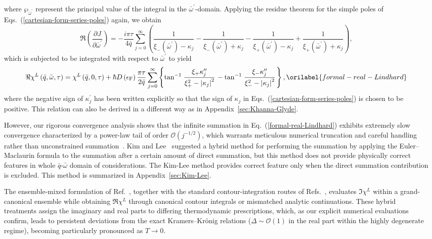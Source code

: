 \documentclass[aps,showkeys,noshowpacs,superscriptaddress,pre,preprint]{revtex4-2}
\let\label\orilabel
\begin{document}
where $\wp_{\bar{\omega}^\prime}$ represent the principal value of the integral in the $\bar{\omega}^\prime$-domain.
Applying the residue theorem for the simple poles of Eqs.~(\ref{cartesian-form-series-poles}) again,
we obtain
\begin{equation*}
\Re \left( \frac{\partial J}{\partial \bar{\omega}^\prime} \right) =
- \frac{ i \pi \tau}{4 \bar{q}} \sum_{j = 0}^{\infty} 
\left(
\frac{1}{\xi_{-} \left( {\bar{\omega}^\prime} \right) - \kappa_j } - \frac{1}{\xi_{-} \left( {\bar{\omega}^\prime} \right) + \kappa_j }
- \frac{1}{\xi_{+} \left( {\bar{\omega}^\prime} \right) - \kappa_j } + \frac{1}{\xi_{+} \left( {\bar{\omega}^\prime} \right) + \kappa_j }
\right)  ,
\end{equation*}
which is subjected to be integrated with respect to $\bar{\omega}^\prime$ to yield
\begin{equation}
\Re \chi^L \left( \bar{q} , \bar{\omega}, \tau \right) =
\chi^L \left( \bar{q} , 0, \tau \right)
+ \hbar D\left( \epsilon_\mathrm{F} \right) \frac{ \pi \tau}{ 2 \bar{q}} \sum_{j = 0}^{\infty}
\left\{
\tan^{-1}\left. \frac{\xi_+ \kappa_j^{\prime\prime}}{\xi_+^2 - \left\vert \kappa_j \right\vert^2} \right.
- \tan^{-1}\left. \frac{\xi_- \kappa_j^{\prime\prime}}{\xi_-^2 - \left\vert \kappa_j \right\vert^2} \right.
\right\} ,
\label{formal-real-Lindhard}
\end{equation}
where the negative sign of $\kappa_j^\prime$ has been written explicitly
so that the sign of $\kappa_j$ in Eqs.~(\ref{cartesian-form-series-poles}) is chosen to be positive.
This relation can also be derived in a different way as in Appendix~\ref{sec:Khanna-Glyde}.

However, our rigorous convergence analysis shows that the infinite summation in Eq.~(\ref{formal-real-Lindhard}) exhibits extremely slow convergence characterized by a power-law tail of order $\mathcal{O}(j^{-1/2})$, which warrants meticulous numerical truncation and careful handling rather than unconstrained summation~\cite{Khanna-Glyde1976,Gouedard-Deutsch1978}.
Kim and Lee~\cite{Kim-Lee1998} suggested a hybrid method for performing the summation 
by applying the Euler--Maclaurin formula to the summation after a certain amount of direct summation,
but this method does not provide physically correct features in whole $\bar{q}$-$\bar{\omega}$ domain of considerations.
The Kim-Lee method provides correct feature only when the direct summation contribution is excluded.
This method is summarized in Appendix~\ref{sec:Kim-Lee}.

The ensemble-mixed formulation of Ref.~\cite{Giuliani-Vignale2005}, together with the standard contour-integration routes of Refs.~\cite{Khanna-Glyde1976,Gouedard-Deutsch1978},
evaluates $\Im\chi^L$ within a grand-canonical ensemble while obtaining $\Re\chi^L$
through canonical contour integrals or mismatched analytic continuations.
These hybrid treatments assign the imaginary and real parts to differing thermodynamic prescriptions, which, as our explicit numerical evaluations confirm, leads to persistent deviations from the exact Kramers--Kr\"onig relations ($\Delta \sim \mathcal{O}(1)$ in the real part within the highly degenerate regime), becoming particularly pronounced as $T \rightarrow 0$.
\end{document}
